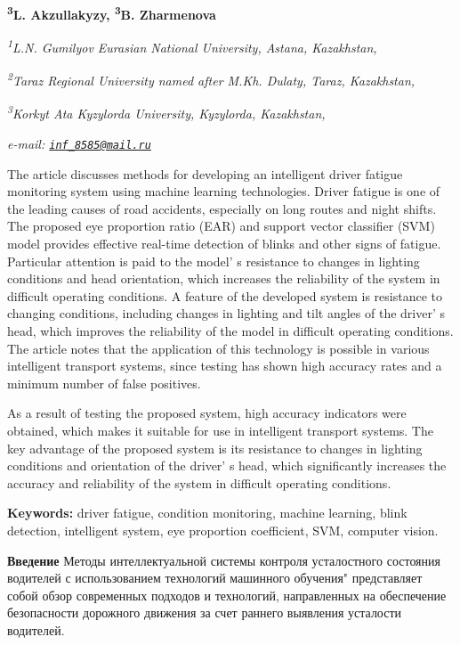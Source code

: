 {\bfseries \textsuperscript{3}L. Akzullakyzy, \textsuperscript{3}B.
Zharmenova}

\emph{\textsuperscript{1}L.N. Gumilyov Eurasian National University,
Astana, Kazakhstan,}

\emph{\textsuperscript{2}Taraz Regional University named after M.Kh.
Dulaty, Taraz, Kazakhstan,}

\emph{\textsuperscript{3}Korkyt Ata Kyzylorda University, Kyzylorda,
Kazakhstan,}

\emph{e-mail:
\href{mailto:inf_8585@mail.ru}{\nolinkurl{inf\_8585@mail.ru}}}

The article discusses methods for developing an intelligent driver
fatigue monitoring system using machine learning technologies. Driver
fatigue is one of the leading causes of road accidents, especially on
long routes and night shifts. The proposed eye proportion ratio (EAR)
and support vector classifier (SVM) model provides effective real-time
detection of blinks and other signs of fatigue. Particular attention is
paid to the model' s resistance to changes in lighting
conditions and head orientation, which increases the reliability of the
system in difficult operating conditions. A feature of the developed
system is resistance to changing conditions, including changes in
lighting and tilt angles of the driver' s head, which
improves the reliability of the model in difficult operating conditions.
The article notes that the application of this technology is possible in
various intelligent transport systems, since testing has shown high
accuracy rates and a minimum number of false positives.

As a result of testing the proposed system, high accuracy indicators
were obtained, which makes it suitable for use in intelligent transport
systems. The key advantage of the proposed system is its resistance to
changes in lighting conditions and orientation of the
driver' s head, which significantly increases the
accuracy and reliability of the system in difficult operating
conditions.

{\bfseries Keywords:} driver fatigue, condition monitoring, machine
learning, blink detection, intelligent system, eye proportion
coefficient, SVM, computer vision.

{\bfseries Введение} Методы интеллектуальной системы контроля усталостного
состояния водителей с использованием технологий машинного обучения"
представляет собой обзор современных подходов и технологий, направленных
на обеспечение безопасности дорожного движения за счет раннего выявления
усталости водителей.

